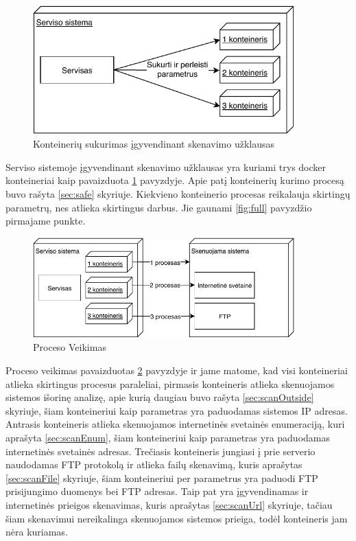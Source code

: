 \documentclass[a4paper,12pt,fleqn]{article}
\begin{document}
\begin{figure}[H]
	\centering
	\includegraphics[width=0.9\textwidth]{figs/1Containerlt.pdf}
	\caption{Konteinerių sukurimas įgyvendinant skenavimo užklausas}
	\label{fig:1Container}
\end{figure}

Serviso sistemoje įgyvendinant skenavimo užklausas yra kuriami trys docker konteineriai kaip pavaizduota \ref{fig:1Container} pavyzdyje. Apie patį konteinerių kurimo procesą buvo rašyta \ref{sec:safe} skyriuje. Kiekvieno konteinerio procesas reikalauja skirtingų parametrų, nes atlieka skirtingus darbus. Jie gaunami \ref{fig:full} pavyzdžio pirmajame punkte.

\begin{figure}[H]
	\centering
	\includegraphics[width=0.9\textwidth]{figs/2Containerlt.pdf}
	\caption{Proceso Veikimas}
	\label{fig:2Container}
\end{figure}

Proceso veikimas pavaizduotas \ref{fig:2Container} pavyzdyje ir jame matome, kad visi konteineriai atlieka skirtingus procesus paraleliai, pirmasis konteineris atlieka skenuojamos sistemos išorinę analizę, apie kurią daugiau buvo rašyta \ref{sec:scanOutside} skyriuje, šiam konteineriui kaip parametras yra paduodamas sistemos IP adresas. Antrasis konteineris atlieka skenuojamos internetinės svetainės enumeraciją, kuri aprašyta \ref{sec:scanEnum}, šiam konteineriui kaip parametras yra paduodamas internetinės svetainės adresas. Trečiasis konteineris jungiasi į prie serverio naudodamas FTP protokolą ir atlieka failų skenavimą, kuris aprašytas \ref{sec:scanFile} skyriuje, šiam konteineriui per parametrus yra paduodi FTP prisijungimo duomenys bei FTP adresas. Taip pat yra įgyvendinamas ir internetinės prieigos skenavimas, kuris aprašytas \ref{sec:scanUrl} skyriuje, tačiau šiam skenavimui nereikalinga skenuojamos sistemos prieiga, todėl konteineris jam nėra kuriamas.
\end{document}
